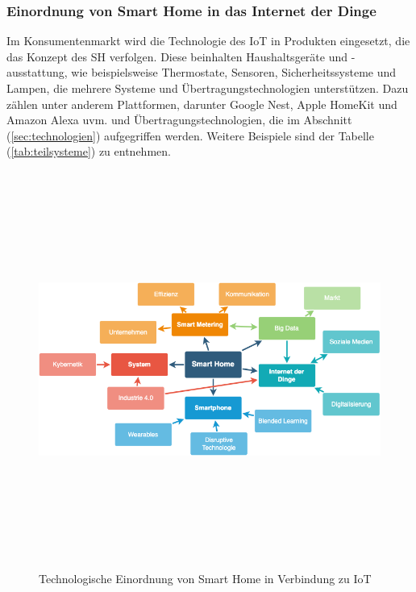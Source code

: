     \subsubsection*{Einordnung von Smart Home in das Internet der Dinge}
    \label{subsubsec:smartHome-IoT}
        Im Konsumentenmarkt wird die Technologie des \acs{IoT} in Produkten eingesetzt, die 
        das Konzept des \acl{SH} verfolgen.  
        Diese beinhalten Haushaltsgeräte und -ausstattung, wie beispielsweise Thermostate, Sensoren, 
        Sicherheitssysteme und Lampen, die mehrere Systeme und Übertragungstechnologien 
        unterstützen. Dazu zählen unter anderem Plattformen, darunter Google Nest, Apple HomeKit 
        und Amazon Alexa uvm. und Übertragungstechnologien, die im Abschnitt (\ref{sec:technologien}) 
        aufgegriffen werden.
        Weitere Beispiele sind der Tabelle (\ref{tab:teilsysteme}) zu entnehmen. 
        \begin{figure}[hbt!]
            \centering
            \includegraphics[width=13cm,height=13cm,keepaspectratio]{images/SH-Mind_Map.png}
            \caption{Technologische Einordnung von Smart Home in Verbindung zu IoT \cite{shmindmap2021}}
            \label{pic:mindmap_SH-IoT}
        \end{figure}
